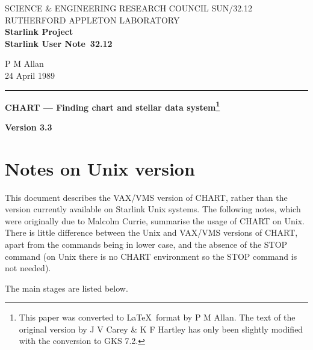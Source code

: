 \documentclass{article}
\newcommand{\stardoccategory}  {Starlink User Note}
\newcommand{\stardocinitials}  {SUN}
\newcommand{\stardocnumber}    {32.12}
\newcommand{\stardocauthors}   {P M Allan}
\newcommand{\stardocdate}      {24 April 1989}
\newcommand{\stardoctitle}     {CHART --- Finding chart and stellar data
system\footnote{This paper was converted to \LaTeX\ format by P M Allan.
The text of the original version by J V Carey \& K F Hartley has only been
slightly modified with the conversion to GKS 7.2.}
}
\newcommand{\stardocname}{\stardocinitials /\stardocnumber}
\begin{document}
\thispagestyle{empty}
SCIENCE \& ENGINEERING RESEARCH COUNCIL \hfill \stardocname\\
RUTHERFORD APPLETON LABORATORY\\
{\large\bf Starlink Project\\}
{\large\bf \stardoccategory\ \stardocnumber}
\begin{flushright}
\stardocauthors\\
\stardocdate
\end{flushright}
\vspace{-4mm}
\rule{\textwidth}{0.5mm}
\vspace{5mm}
\begin{center}
{\Large\bf \stardoctitle}
\end{center}
\vspace{5mm}


\begin{center}
{\Large\bf Version 3.3}
\end{center}

\section{Notes on Unix version}

This document describes the VAX/VMS version of CHART, rather than the
version currently available on Starlink Unix systems. The following
notes, which were originally due to Malcolm Currie, summarise the
usage of CHART on Unix. There is little difference between the Unix
and VAX/VMS versions of CHART, apart from the commands being in lower
case, and the absence of the STOP command (on Unix there is no CHART
environment so the STOP command is not needed).

  The main stages are listed below.
\end{document}
